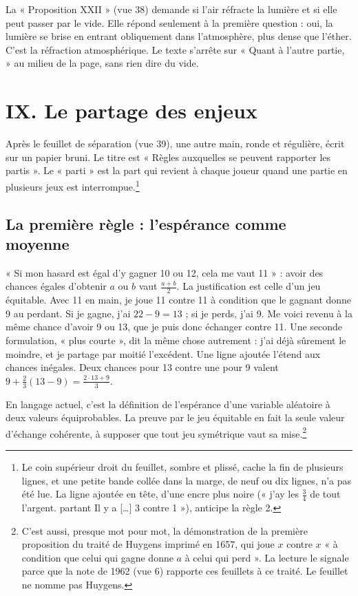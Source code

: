 \documentclass[11pt,a4paper]{article}
\begin{document}
La « Proposition XXII » (vue 38) demande si l'air réfracte la lumière et si
elle peut passer par le vide. Elle répond seulement à la première question :
oui, la lumière se brise en entrant obliquement dans l'atmosphère, plus dense
que l'éther. C'est la réfraction atmosphérique. Le texte s'arrête sur « Quant
à l'autre partie, » au milieu de la page, sans rien dire du vide.

\section*{IX. Le partage des enjeux}

Après le feuillet de séparation (vue 39), une autre main, ronde et régulière,
écrit sur un papier bruni. Le titre est « Règles auxquelles se peuvent
rapporter les partis ». Le « parti » est la part qui revient à chaque joueur
quand une partie en plusieurs jeux est interrompue.\footnote{Le coin supérieur
droit du feuillet, sombre et plissé, cache la fin de plusieurs lignes, et une
petite bande collée dans la marge, de neuf ou dix lignes, n'a pas été lue. La
ligne ajoutée en tête, d'une encre plus noire (« j'ay les \(\frac34\) de tout
l'argent. partant Il y a […] 3 contre 1 »), anticipe la règle 2.}

\subsection*{La première règle : l'espérance comme moyenne}

« Si mon hasard est égal d'y gagner 10 ou 12, cela me vaut 11 » : avoir des
chances égales d'obtenir \(a\) ou \(b\) vaut \(\frac{a+b}{2}\). La justification
est celle d'un jeu équitable. Avec 11 en main, je joue 11 contre 11 à condition
que le gagnant donne 9 au perdant. Si je gagne, j'ai \(22-9=13\) ; si je perds,
j'ai 9. Me voici revenu à la même chance d'avoir 9 ou 13, que je puis donc
échanger contre 11. Une seconde formulation, « plus courte », dit la même chose
autrement : j'ai déjà sûrement le moindre, et je partage par moitié
l'excédent. Une ligne ajoutée l'étend aux chances inégales. Deux chances pour
13 contre une pour 9 valent \(9+\frac23(13-9)=\frac{2\cdot13+9}{3}\).

En langage actuel, c'est la définition de l'espérance d'une variable aléatoire
à deux valeurs équiprobables. La preuve par le jeu équitable en fait la seule
valeur d'échange cohérente, à supposer que tout jeu symétrique vaut sa
mise.\footnote{C'est aussi, presque mot pour mot, la démonstration de la
première proposition du traité de Huygens imprimé en 1657, qui joue \(x\) contre
\(x\) « à condition que celui qui gagne donne \(a\) à celui qui perd ». La
lecture le signale parce que la note de 1962 (vue 6) rapporte ces feuillets à
ce traité. Le feuillet ne nomme pas Huygens.}
\end{document}
